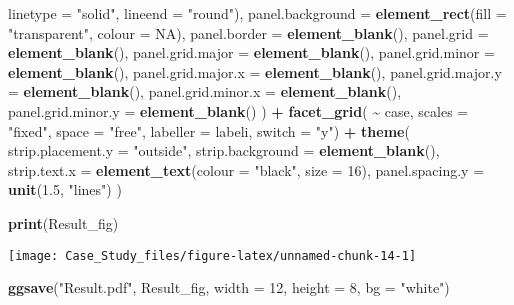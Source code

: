 \documentclass[
]{article}
\newenvironment{Shaded}{\begin{snugshade}}{\end{snugshade}}
\newcommand{\AttributeTok}[1]{\textcolor[rgb]{0.13,0.29,0.53}{#1}}
\newcommand{\ConstantTok}[1]{\textcolor[rgb]{0.56,0.35,0.01}{#1}}
\newcommand{\DecValTok}[1]{\textcolor[rgb]{0.00,0.00,0.81}{#1}}
\newcommand{\FloatTok}[1]{\textcolor[rgb]{0.00,0.00,0.81}{#1}}
\newcommand{\FunctionTok}[1]{\textcolor[rgb]{0.13,0.29,0.53}{\textbf{#1}}}
\newcommand{\NormalTok}[1]{#1}
\newcommand{\SpecialCharTok}[1]{\textcolor[rgb]{0.81,0.36,0.00}{\textbf{#1}}}
\newcommand{\StringTok}[1]{\textcolor[rgb]{0.31,0.60,0.02}{#1}}
\begin{document}
\begin{Shaded}
\begin{Highlighting}[]
                          \AttributeTok{linetype =} \StringTok{"solid"}\NormalTok{, }\AttributeTok{lineend =} \StringTok{"round"}\NormalTok{),}
    \AttributeTok{panel.background =} \FunctionTok{element\_rect}\NormalTok{(}\AttributeTok{fill =} \StringTok{"transparent"}\NormalTok{, }\AttributeTok{colour =} \ConstantTok{NA}\NormalTok{),}
    \AttributeTok{panel.border =} \FunctionTok{element\_blank}\NormalTok{(),}
    \AttributeTok{panel.grid =} \FunctionTok{element\_blank}\NormalTok{(),}
    \AttributeTok{panel.grid.major =} \FunctionTok{element\_blank}\NormalTok{(),}
    \AttributeTok{panel.grid.minor =} \FunctionTok{element\_blank}\NormalTok{(),}
    \AttributeTok{panel.grid.major.x =} \FunctionTok{element\_blank}\NormalTok{(),}
    \AttributeTok{panel.grid.major.y =} \FunctionTok{element\_blank}\NormalTok{(),}
    \AttributeTok{panel.grid.minor.x =} \FunctionTok{element\_blank}\NormalTok{(),}
    \AttributeTok{panel.grid.minor.y =} \FunctionTok{element\_blank}\NormalTok{()}
\NormalTok{  ) }\SpecialCharTok{+}
  \FunctionTok{facet\_grid}\NormalTok{( }\SpecialCharTok{\textasciitilde{}}\NormalTok{ case, }\AttributeTok{scales =} \StringTok{"fixed"}\NormalTok{, }\AttributeTok{space =} \StringTok{"free"}\NormalTok{, }
              \AttributeTok{labeller =}\NormalTok{ labeli, }\AttributeTok{switch =} \StringTok{"y"}\NormalTok{) }\SpecialCharTok{+}
  \FunctionTok{theme}\NormalTok{(}
    \AttributeTok{strip.placement.y =} \StringTok{"outside"}\NormalTok{,}
    \AttributeTok{strip.background =} \FunctionTok{element\_blank}\NormalTok{(),}
    \AttributeTok{strip.text.x =} \FunctionTok{element\_text}\NormalTok{(}\AttributeTok{colour =} \StringTok{"black"}\NormalTok{, }\AttributeTok{size =} \DecValTok{16}\NormalTok{),}
    \AttributeTok{panel.spacing.y =} \FunctionTok{unit}\NormalTok{(}\FloatTok{1.5}\NormalTok{, }\StringTok{"lines"}\NormalTok{)}
\NormalTok{  )}
\end{Highlighting}
\end{Shaded}

\begin{Shaded}
\begin{Highlighting}[]
\FunctionTok{print}\NormalTok{(Result\_fig)}
\end{Highlighting}
\end{Shaded}

\begin{center}\texttt{[image: Case\_Study\_files/figure-latex/unnamed-chunk-14-1]} \end{center}

\begin{Shaded}
\begin{Highlighting}[]
\FunctionTok{ggsave}\NormalTok{(}\StringTok{"Result.pdf"}\NormalTok{, Result\_fig, }\AttributeTok{width =} \DecValTok{12}\NormalTok{, }\AttributeTok{height =} \DecValTok{8}\NormalTok{, }\AttributeTok{bg =} \StringTok{"white"}\NormalTok{)}
\end{Highlighting}
\end{Shaded}
\end{document}

